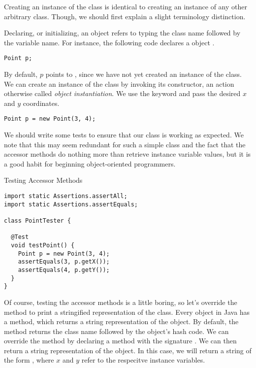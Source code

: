 Creating an instance of the  class is identical to creating an instance of any other arbitrary class. Though, we should first explain a slight terminology distinction.

Declaring, or initializing, an object refers to typing the class name followed by the variable name. For instance, the following code declares a  object .

\par{
\begin{verbatim}
Point p;
\end{verbatim}
}

By default, $p$ points to , since we have not yet created an instance of the  class. We can create an instance of the  class by invoking its constructor, an action otherwise called \textit{object instantiation}. We use the  keyword and pass the desired $x$ and $y$ coordinates. 

\par{
\begin{verbatim}
Point p = new Point(3, 4);
\end{verbatim}
}

We should write some tests to ensure that our  class is working as expected. We note that this may seem redundant for such a simple class and the fact that the accessor methods do nothing more than retrieve instance variable values, but it is a good habit for beginning object-oriented programmers.

\begin{cl}[]{Testing Accessor Methods}
\begin{lstlisting}[language=MyJava]
import static Assertions.assertAll;
import static Assertions.assertEquals;

class PointTester {
  
  @Test
  void testPoint() {
    Point p = new Point(3, 4);
    assertEquals(3, p.getX());
    assertEquals(4, p.getY());
  }
}
\end{lstlisting}
\end{cl}

Of course, testing the accessor methods is a little boring, so let's override the  method to print a stringified representation of the  class. Every object in Java has a  method, which returns a string representation of the object. By default, the  method returns the class name followed by the object's hash code. We can override the  method by declaring a  method with the signature . We can then return a string representation of the object. In this case, we will return a string of the form , where $x$ and $y$ refer to the respecitve instance variables.

